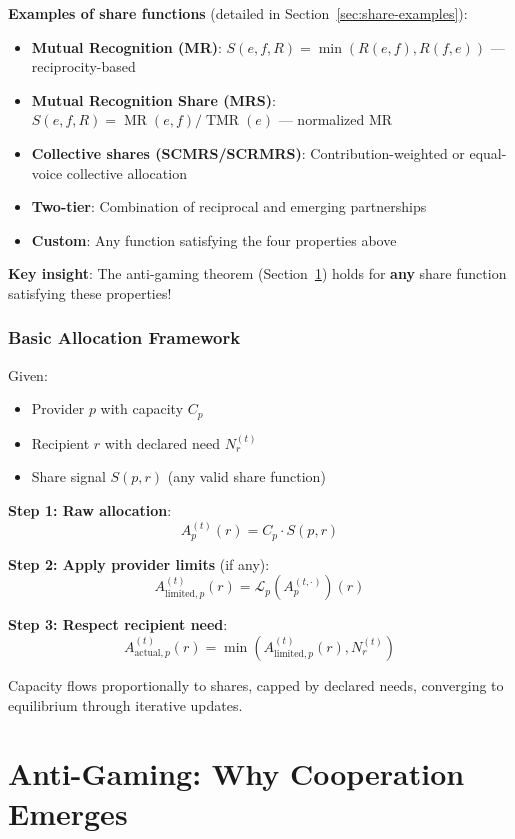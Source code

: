 \documentclass[11pt,a4paper]{article}
\theoremstyle{definition}
\theoremstyle{remark}
\DeclareMathOperator{\TMR}{TMR}
\DeclareMathOperator{\MR}{MR}
\begin{document}
\textbf{Examples of share functions} (detailed in Section~\ref{sec:share-examples}):
\begin{itemize}
\item \textbf{Mutual Recognition (MR)}: $S(e,f,R) = \min(R(e,f), R(f,e))$ --- reciprocity-based
\item \textbf{Mutual Recognition Share (MRS)}: $S(e,f,R) = \MR(e,f)/\TMR(e)$ --- normalized MR
\item \textbf{Collective shares (SCMRS/SCRMRS)}: Contribution-weighted or equal-voice collective allocation
\item \textbf{Two-tier}: Combination of reciprocal and emerging partnerships
\item \textbf{Custom}: Any function satisfying the four properties above
\end{itemize}

\textbf{Key insight}: The anti-gaming theorem (Section~\ref{sec:anti-gaming}) holds for \textbf{any} share function satisfying these properties!

\subsubsection{Basic Allocation Framework}

Given:
\begin{itemize}
\item Provider $p$ with capacity $C_p$
\item Recipient $r$ with declared need $N_r^{(t)}$
\item Share signal $S(p,r)$ (any valid share function)
\end{itemize}

\textbf{Step 1: Raw allocation}:
\[ A_p^{(t)}(r) = C_p \cdot S(p,r) \]

\textbf{Step 2: Apply provider limits} (if any):
\[ A_{\text{limited},p}^{(t)}(r) = \mathcal{L}_p(A_p^{(t,\cdot)})(r) \]

\textbf{Step 3: Respect recipient need}:
\[ A_{\text{actual},p}^{(t)}(r) = \min(A_{\text{limited},p}^{(t)}(r), N_r^{(t)}) \]

Capacity flows proportionally to shares, capped by declared needs, converging to equilibrium through iterative updates.

\section{Anti-Gaming: Why Cooperation Emerges}
\label{sec:anti-gaming}
\end{document}
